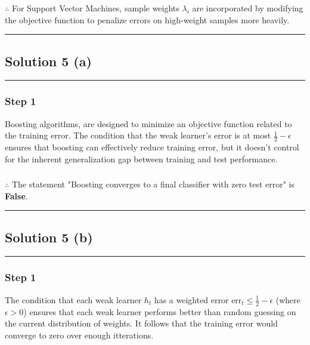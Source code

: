 \documentclass{article}
\begin{document}
\subsubsection*{\normalfont}{$\therefore$ For Support Vector Machines, sample weights $\lambda_i$ are incorporated by modifying the objective function to penalize errors on high-weight samples more heavily.}

\noindent\rule{\textwidth}{0.4pt}

\newpage

\subsection*{Solution 5 (a)}
\noindent\rule{\textwidth}{0.4pt}

\subsubsection*{Step 1}
\parbox{\textwidth}{
  Boosting algorithms, are designed to minimize an objective function related to the training error. The condition that the weak learner's error is at most $\tfrac12 - \epsilon$ ensures that boosting can effectively reduce training error, but it doesn't control for the inherent generalization gap between training and test performance.
}

\subsubsection*{\normalfont}{$\therefore$ The statement "Boosting converges to a final classifier with zero test error" is \textbf{False}.}


\noindent\rule{\textwidth}{0.4pt}

\newpage

\subsection*{Solution 5 (b)}
\noindent\rule{\textwidth}{0.4pt}

\subsubsection*{Step 1}
\parbox{\textwidth}{
  The condition that each weak learner $h_t$ has a weighted error $\text{err}_t \le \frac{1}{2} - \epsilon$ (where $\epsilon > 0$) ensures that each weak learner performs better than random guessing on the current distribution of weights.
  It follows that the training error would converge to zero over enough itterations.
}
\end{document}
